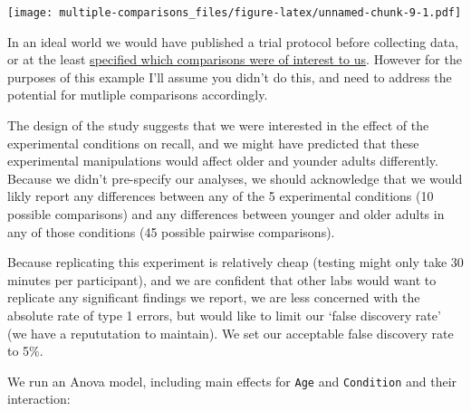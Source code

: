 \documentclass[]{article}
\newenvironment{Shaded}{\begin{snugshade}}{\end{snugshade}}
\newcommand{\DataTypeTok}[1]{\textcolor[rgb]{0.13,0.29,0.53}{#1}}
\newcommand{\DecValTok}[1]{\textcolor[rgb]{0.00,0.00,0.81}{#1}}
\newcommand{\KeywordTok}[1]{\textcolor[rgb]{0.13,0.29,0.53}{\textbf{#1}}}
\newcommand{\NormalTok}[1]{#1}
\newcommand{\OperatorTok}[1]{\textcolor[rgb]{0.81,0.36,0.00}{\textbf{#1}}}
\newcommand{\StringTok}[1]{\textcolor[rgb]{0.31,0.60,0.02}{#1}}
\begin{document}
\texttt{[image: multiple-comparisons\_files/figure-latex/unnamed-chunk-9-1.pdf]}

In an ideal world we would have published a trial protocol before collecting
data, or at the least
\protect\hyperlink{register-predictions}{specified which comparisons were of interest to us}.
However for the purposes of this example I'll assume you didn't do this, and
need to address the potential for mutliple comparisons accordingly.

The design of the study suggests that we were interested in the effect of the
experimental conditions on recall, and we might have predicted that these
experimental manipulations would affect older and younder adults differently.
Because we didn't pre-specify our analyses, we should acknowledge that we would
likly report any differences between any of the 5 experimental conditions (10
possible comparisons) and any differences between younger and older adults in
any of those conditions (45 possible pairwise comparisons).

Because replicating this experiment is relatively cheap (testing might only take
30 minutes per participant), and we are confident that other labs would want to
replicate any significant findings we report, we are less concerned with the
absolute rate of type 1 errors, but would like to limit our `false discovery
rate' (we have a repututation to maintain). We set our acceptable false
discovery rate to 5\%.

We run an Anova model, including main effects for \texttt{Age} and \texttt{Condition} and
their interaction:

\begin{Shaded}
\end{Shaded}
\end{document}
